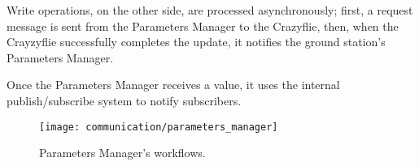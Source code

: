 Write operations, on the other side, are processed asynchronously; first, a request message is sent from the Parameters Manager to the Crazyflie,
then, when the Crayzyflie successfully completes the update, it notifies the ground station's Parameters Manager.

Once the Parameters Manager receives a value, it uses the internal publish/subscribe system to notify subscribers.  

\begin{figure}[tb]
    \centering
    \texttt{[image: communication/parameters\_manager]}
    \caption{Parameters Manager's workflows.}\label{fig:parameters_manager}
\end{figure}

